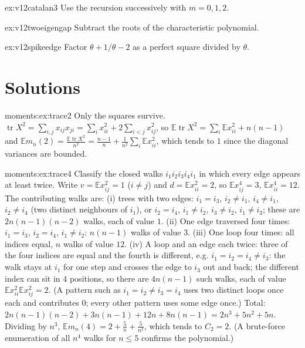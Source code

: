 \begin{hint}{ex:v12catalan3}
Use the recursion successively with $m=0,1,2$.
\end{hint}

\begin{hint}{ex:v12twoeigengap}
Subtract the roots of the characteristic polynomial.
\end{hint}

\begin{hint}{ex:v12spikeedge}
Factor $\theta+1/\theta-2$ as a perfect square divided by $\theta$.
\end{hint}

\section{Solutions}
\begin{solution}{moments:ex:trace2}
\idea Only the squares survive.
\writeup $\operatorname{tr}X^2=\sum_{i,j}x_{ij}x_{ji}=\sum_ix_{ii}^2+2\sum_{i<j}x_{ij}^2$, so $\mathbb E\operatorname{tr}X^2=\sum_i\mathbb Ex_{ii}^2+n(n-1)$ and
$\mathbb Em_n(2)=\frac{\mathbb E\operatorname{tr}X^2}{n^2}=\frac{n-1}n+\frac1{n^2}\sum_i\mathbb Ex_{ii}^2$, which tends to $1$ since the diagonal variances are bounded.
\end{solution}
\begin{solution}{moments:ex:trace4}
\idea Classify the closed walks $i_1i_2i_3i_4i_1$ in which every edge appears at least twice.
\writeup Write $v=\mathbb E x_{ij}^2=1$ ($i\ne j$) and $d=\mathbb Ex_{ii}^2=2$, so $\mathbb Ex_{ij}^4=3$, $\mathbb Ex_{ii}^4=12$. The contributing walks are:
(i) trees with two edges: $i_1=i_3$, $i_2\ne i_1$, $i_4\ne i_1$, $i_2\ne i_4$ (two distinct neighbours of $i_1$), or $i_2=i_4$, $i_1\ne i_2$, $i_3\ne i_2$, $i_1\ne i_3$;
these are $2n(n-1)(n-2)$ walks, each of value $1$. (ii) One edge traversed four times: $i_1=i_3$, $i_2=i_4$, $i_1\ne i_2$: $n(n-1)$ walks of value $3$.
(iii) One loop four times: all indices equal, $n$ walks of value $12$. (iv) A loop and an edge each twice: three of the four indices are equal and the fourth is different, e.g. $i_1=i_2=i_4\ne i_3$: the walk stays at
$i_1$ for one step and crosses the edge to $i_3$ out and back; the different index can sit in $4$ positions, so there are $4n(n-1)$ such walks, each of
value $\mathbb Ex_{ii}^2\mathbb Ex_{ij}^2=2$. (A pattern such as $i_1=i_2\ne i_3=i_4$ uses two distinct loops once each and contributes $0$; every other
pattern uses some edge once.) Total:
$2n(n-1)(n-2)+3n(n-1)+12n+8n(n-1)=2n^3+5n^2+5n$. Dividing by $n^3$, $\mathbb Em_n(4)=2+\frac5n+\frac5{n^2}$, which tends to $C_2=2$.
(A brute-force enumeration of all $n^4$ walks for $n\le5$ confirms the polynomial.)
\end{solution}

